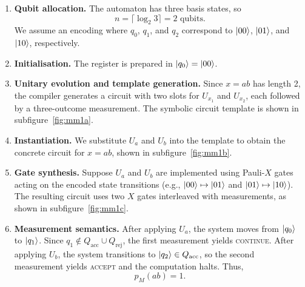 \begin{enumerate}
  \item \textbf{Qubit allocation.} The automaton has three basis states, so
  \[
  n = \lceil \log_2 3 \rceil = 2 \text{ qubits}.
  \]
  We assume an encoding where $q_0$, $q_1$, and $q_2$ correspond to $\ket{00}$, $\ket{01}$, and $\ket{10}$, respectively.

  \item \textbf{Initialisation.} The register is prepared in $\ket{q_0} = \ket{00}$.

  \item \textbf{Unitary evolution and template generation.} Since $x = ab$ has length 2, the compiler generates a circuit with two slots for $U_{x_1}$ and $U_{x_2}$, each followed by a three-outcome measurement. The symbolic circuit template is shown in subfigure~\ref{fig:mm1a}.

  \item \textbf{Instantiation.} We substitute $U_a$ and $U_b$ into the template to obtain the concrete circuit for $x = ab$, shown in subfigure~\ref{fig:mm1b}.

  \item \textbf{Gate synthesis.} Suppose $U_a$ and $U_b$ are implemented using Pauli-$X$ gates acting on the encoded state transitions (e.g., $\ket{00} \mapsto \ket{01}$ and $\ket{01} \mapsto \ket{10}$). The resulting circuit uses two $X$ gates interleaved with measurements, as shown in subfigure~\ref{fig:mm1c}.

  \item \textbf{Measurement semantics.} After applying $U_a$, the system moves from $\ket{q_0}$ to $\ket{q_1}$. Since $q_1 \notin Q_{\text{acc}} \cup Q_{\text{rej}}$, the first measurement yields \textsc{continue}. After applying $U_b$, the system transitions to $\ket{q_2} \in Q_{\text{acc}}$, so the second measurement yields \textsc{accept} and the computation halts. Thus,
  \[
  p_M(ab) = 1.
  \]
\end{enumerate}
\vspace{1em}
